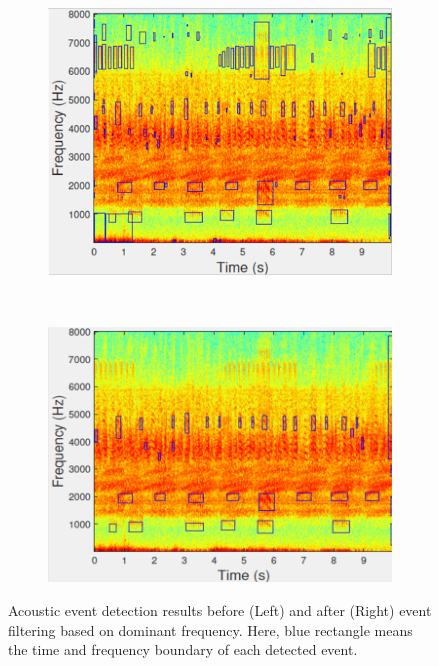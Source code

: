 \begin{figure}[htb!]
\centering

        \begin{subfigure}[b]{0.45\textwidth}
                \includegraphics[width=\textwidth, height =0.8 \textwidth]{image/Ch6/AEoriginal.png}
        \end{subfigure}
       ~
              \begin{subfigure}[b]{0.45\textwidth}
                \includegraphics[width=\textwidth,height = 0.8 \textwidth]{image/Ch6/AEfinal.png}
                
        \end{subfigure}  
     
\caption[Acoustic event detection results]{Acoustic event detection results before (Left) and after (Right) event filtering based on dominant frequency. Here, blue rectangle means the time and frequency boundary of each detected event.}
        \label{fig:feature}
\end{figure}

